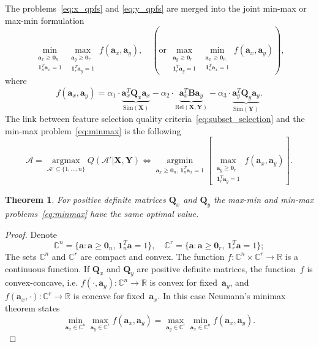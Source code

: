 \documentclass[12pt,twoside]{article}
\newtheorem{theorem}{Theorem}
\newcommand{\ba}{\mathbf{a}}
\newcommand{\bY}{\mathbf{Y}}
\newcommand{\bX}{\mathbf{X}}
\newcommand{\bB}{\mathbf{B}}
\newcommand{\bQ}{\mathbf{Q}}
\newcommand{\bbR}{\mathbb{R}}
\newcommand{\cA}{\mathcal{A}}
\newcommand{\bOne}{\boldsymbol{1}}
\newcommand{\bZero}{\boldsymbol{0}}
\newcommand{\argmin}{\mathop{\arg \min}\limits}
\newcommand{\argmax}{\mathop{\arg \max}\limits}
\begin{document}
The problems~\eqref{eq:x_qpfs} and \eqref{eq:y_qpfs} are merged into the joint min-max or max-min formulation
\begin{equation}
	\min_{\substack{\ba_x \geq \bZero_n \\ \bOne_n^T\ba_x=1}} 	\max_{\substack{\ba_y \geq \bZero_r \\ \bOne_r^T\ba_y=1}} f(\ba_x, \ba_y), \quad \left(\text {or} \, \max_{\substack{\ba_y \geq \bZero_r \\ \bOne_r^T\ba_y=1}} \min_{\substack{\ba_x \geq \bZero_n \\ \bOne_n^T\ba_x=1}} f(\ba_x, \ba_y)\right),
	\label{eq:minmax}
\end{equation}
where
\[
	f(\ba_x, \ba_y) = \alpha_1 \cdot \underbrace{\ba_x^T \bQ_x \ba_x}_{\text{Sim}(\bX)} - \alpha_2 \cdot \underbrace{\ba_x^T \bB \ba_y}_{\text{Rel}(\bX, \bY)} - \alpha_3 \cdot \underbrace{\ba_y^T \bQ_y \ba_y}_{\text{Sim}(\bY)}.
\]
The link between feature selection quality criteria~\eqref{eq:subset_selection} and the min-max problem~\eqref{eq:minmax} is the following
\begin{equation}
\cA = \argmax_{\cA' \subseteq \{1, \dots, n\}} Q(\cA' | \bX, \bY) \Leftrightarrow \argmin_{\ba_x \geq \bZero_n, \, \bOne_n^T\ba_x=1} \left[\max_{\substack{\ba_y \geq \bZero_r \\ \bOne_r^T\ba_y=1}} f(\ba_x, \ba_y)\right].
\end{equation}
\begin{theorem}
	For positive definite matrices $\bQ_x$ and $\bQ_y$ the max-min and min-max problems~\eqref{eq:minmax} have the same optimal value. 
\end{theorem}
\begin{proof}
	Denote 
	\begin{equation*}
	\mathbb{C}^n = \{\ba : \ba \geq \bZero_n, \, \bOne_n^T\ba=1\}, \quad \mathbb{C}^r = \{\ba : \ba \geq \bZero_r, \, \bOne_r^T\ba=1\};
	\end{equation*}
	The sets $\mathbb{C}^n$ and $\mathbb{C}^r$ are compact and convex. The function $f: \mathbb{C}^n \times \mathbb{C}^r \rightarrow \bbR$ is a continuous function. If $\bQ_x$ and $\bQ_y$ are positive definite matrices, the function~$f$ is convex-concave, i.e.
	$f(\cdot, \ba_y): \mathbb{C}^n \rightarrow \bbR$ is convex for fixed~$\ba_y$, and $f(\ba_x, \cdot): \mathbb{C}^r \rightarrow \bbR$ is concave for fixed~$\ba_x$. 
	In this case Neumann's minimax theorem states
	\[
	\min_{\ba_x \in \mathbb{C}^n} \max_{\ba_y \in \mathbb{C}^r} f(\ba_x, \ba_y) = \max_{\ba_y \in \mathbb{C}^r} \min_{\ba_x\in \mathbb{C}^n} f(\ba_x, \ba_y).
	\]
\end{proof}
\end{document}

